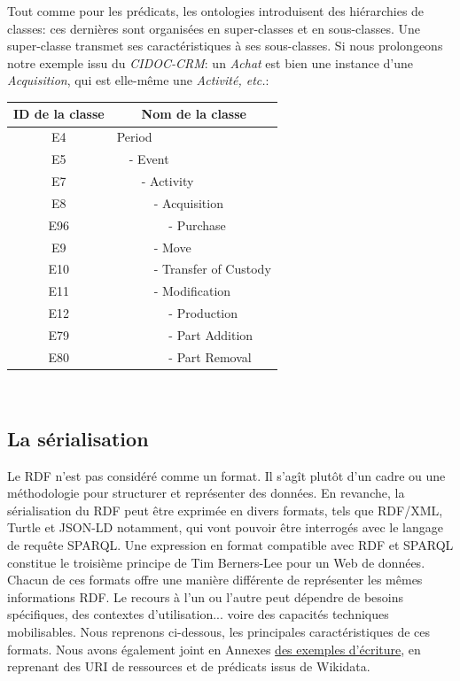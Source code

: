 \documentclass[a4paper,12pt,twoside]{book}
\begin{document}
Tout comme pour les prédicats, les ontologies introduisent des hiérarchies de classes: ces dernières sont organisées en super-classes et en sous-classes. Une super-classe transmet ses caractéristiques à ses sous-classes. Si nous prolongeons notre exemple issu du \textit{CIDOC-CRM}: un \textit{Achat} est bien une instance d'une \textit{Acquisition}, qui est elle-même une \textit{Activité, etc.}:

\begin{center}  
\begin{tabular}{|c|lllll|}
\hline
ID de la classe & \multicolumn{5}{|c|}{Nom de la classe}\\ 
\hline
E4  & \multicolumn{5}{|l|}{Period}\\ 
\hline
E5 & & \multicolumn{4}{l|}{- Event}\\
\hline
E7 & & & \multicolumn{3}{l|}{- Activity}\\
\hline
E8 & & & & \multicolumn{2}{l|}{- Acquisition}\\
\hline
E96 & & & & & \multicolumn{1}{l|}{- Purchase}\\
\hline
E9 & & & & \multicolumn{2}{l|}{- Move}\\
\hline
E10 & & & & \multicolumn{2}{l|}{- Transfer of Custody}\\
\hline
E11 & & & & \multicolumn{2}{l|}{- Modification}\\
\hline
E12 & & & & & \multicolumn{1}{l|}{- Production}\\
\hline
E79 & & & & & \multicolumn{1}{l|}{- Part Addition}\\
\hline
E80 & & & & & \multicolumn{1}{l|}{- Part Removal}\\
\hline
\end{tabular}\
\end{center}

\subsection{La sérialisation}
Le RDF n'est pas considéré comme un format. Il s'agît plutôt d'un cadre ou une méthodologie pour structurer et représenter des données. En revanche, la sérialisation du RDF peut être exprimée en divers formats, tels que RDF/XML, Turtle et JSON-LD notamment, qui vont pouvoir être interrogés avec le langage de requête SPARQL. Une expression en format compatible avec RDF et SPARQL constitue le troisième principe de Tim Berners-Lee pour un Web de données.\\

Chacun de ces formats offre une manière différente de représenter les mêmes informations RDF. Le recours à l'un ou l'autre peut dépendre de besoins spécifiques, des contextes d'utilisation... voire des capacités techniques mobilisables. Nous reprenons ci-dessous, les principales caractéristiques de ces formats. Nous avons également joint en Annexes \hyperref[annexe-syntaxes]{des exemples d'écriture}, en reprenant des URI de ressources et de prédicats issus de Wikidata. 
\end{document}
